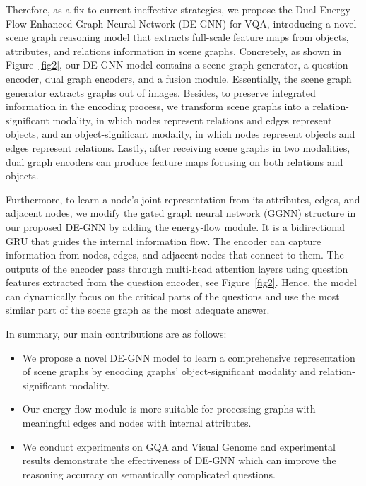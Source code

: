 \documentclass[letterpaper]{article} %
\begin{document}
Therefore, as a fix to current ineffective strategies, we propose the Dual Energy-Flow Enhanced Graph Neural Network (DE-GNN) for VQA, introducing a novel scene graph reasoning model that extracts full-scale feature maps from objects, attributes, and relations information in scene graphs. 
Concretely, as shown in Figure~\ref{fig2}, our DE-GNN model contains a scene graph generator, a question encoder, dual graph encoders, and a fusion module. 
Essentially, the scene graph generator extracts graphs out of images. 
Besides, to preserve integrated information in the encoding process, we transform scene graphs into a relation-significant modality, in which nodes represent relations and edges represent objects, and an object-significant modality, in which nodes represent objects and edges represent relations. Lastly, after receiving scene graphs in two modalities, dual graph encoders can produce feature maps focusing on both relations and objects.

Furthermore, to learn a node's joint representation from its attributes, edges, and adjacent nodes, we modify the gated graph neural network (GGNN) structure in our proposed DE-GNN by adding the energy-flow module. 
It is a bidirectional GRU that guides the internal information flow.
The encoder can capture information from nodes, edges, and adjacent nodes that connect to them. 
The outputs of the encoder pass through multi-head attention layers using question features extracted from the question encoder, see Figure~\ref{fig2}. 
Hence, the model can dynamically focus on the critical parts of the questions and use the most similar part of the scene graph as the most adequate answer.

In summary, our main contributions are as follows:%
\begin{itemize}
\setlength{\itemsep}{5pt}
\setlength{\parsep}{5pt}
\setlength{\parskip}{5pt}
\item We propose a novel DE-GNN model to learn a comprehensive representation of scene graphs by encoding graphs' object-significant modality and relation-significant modality.\vspace{-0.06in}

\item Our energy-flow module is more suitable for processing graphs with meaningful edges and nodes with internal attributes.\vspace{-0.06in}

\item We conduct experiments on GQA and Visual Genome and experimental results demonstrate the effectiveness of DE-GNN which can improve the reasoning accuracy on semantically complicated questions.
\end{itemize}\vspace{-0.06in}
\end{document}
